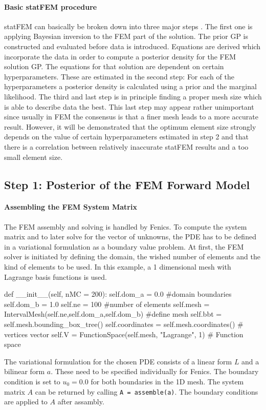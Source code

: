 \documentclass[%
  a4paper,oneside,%
  11pt,%
  smallchapters,
  green,%
  rgb, <cmyk>
  ]{tubsbook}
\begin{document}
\paragraph{Basic statFEM procedure}
statFEM can basically be broken down into three major steps \cite{girolami2021}. The first one is applying Bayesian inversion to the FEM part of the solution. The prior GP is constructed and evaluated before data is introduced. Equations are derived which incorporate the data in order to compute a posterior density for the FEM solution GP. The equations for that solution are dependent on certain hyperparameters. These are estimated in the second step: For each of the hyperparameters a posterior density is calculated using a prior and the marginal likelihood. The third and last step is in principle finding a proper mesh size which is able to describe data the best. This last step may appear rather unimportant since usually in FEM the consensus is that a finer mesh leads to a more accurate result. However, it will be demonstrated that the optimum element size strongly depends on the value of certain hyperparameters estimated in step 2 and that there is a correlation between relatively inaccurate statFEM results and a too small element size.

\subsection{Step 1: Posterior of the FEM Forward Model}

\paragraph{Assembling the FEM System Matrix}
The FEM assembly and solving is handled by Fenics. To compute the system matrix and to later solve for the vector of unknowns, the PDE has to be defined in a variational formulation as a boundary value problem.
At first, the FEM solver is initiated by defining the domain, the wished number of elements and the kind of elements to be used. In this example, a 1 dimensional mesh with Lagrange basis functions is used.
\begin{python}
def __init__(self, nMC = 200):
	self.dom_a = 0.0 #domain boundaries
	self.dom_b = 1.0
	self.ne	= 100 #number of elements
	self.mesh = IntervalMesh(self.ne,self.dom_a,self.dom_b) #define mesh
	self.bbt = self.mesh.bounding_box_tree()
	self.coordinates = self.mesh.coordinates() # vertices vector
	self.V = FunctionSpace(self.mesh, "Lagrange", 1) # Function space
\end{python}
The variational formulation for the chosen PDE consists of a linear form $L$ and a bilinear form $a$. These need to be specified individually for Fenics. The boundary condition is set to $u_0 = 0.0$ for both boundaries in the 1D mesh. The system matrix $A$ can be returned by calling \texttt{A = assemble(a)}. The boundary conditions are applied to $A$ after assambly.
\end{document}
